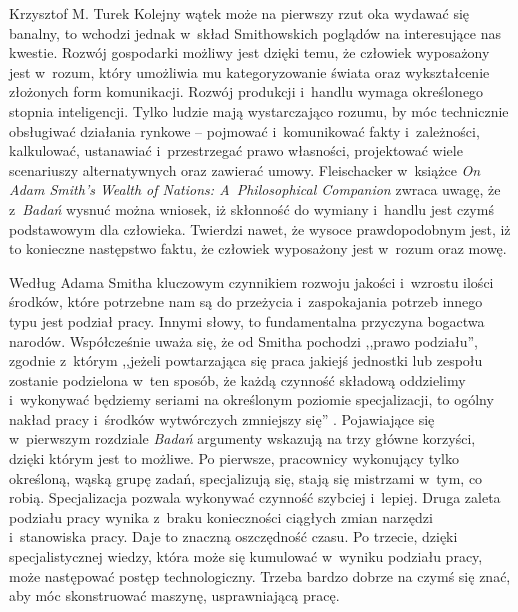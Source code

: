 \begin{artplenv}{Krzysztof M. Turek}
Kolejny wątek może na pierwszy rzut oka wydawać się banalny, to wchodzi jednak w~skład Smithowskich poglądów na
interesujące nas kwestie. Rozwój gospodarki możliwy jest dzięki temu, że człowiek wyposażony jest w~rozum, który
umożliwia mu kategoryzowanie świata oraz wykształcenie złożonych form komunikacji. Rozwój produkcji i~handlu wymaga
określonego stopnia inteligencji. Tylko ludzie mają wystarczająco rozumu, by móc technicznie obsługiwać działania
rynkowe -- pojmować i~komunikować fakty i~zależności, kalkulować, ustanawiać i~przestrzegać prawo własności, projektować
wiele scenariuszy alternatywnych oraz zawierać umowy. Fleischacker
\parencite*[s.~19]{fleischacker_adam_2005}
w~książce
\textit{On Adam Smith's Wealth of Nations: A~Philosophical Companion} zwraca uwagę, że z~\textit{Badań }wysnuć można
wniosek, iż skłonność do wymiany i~handlu jest czymś podstawowym dla człowieka. Twierdzi nawet, że wysoce
prawdopodobnym jest, iż to konieczne następstwo faktu, że człowiek wyposażony jest w~rozum oraz mowę.

Według Adama Smitha kluczowym czynnikiem rozwoju jakości i~wzrostu ilości środków, które potrzebne nam są do
przeżycia i~zaspokajania potrzeb innego typu jest podział pracy. Innymi słowy, to fundamentalna przyczyna bogactwa narodów.
Współcześnie uważa się, że od Smitha pochodzi ,,prawo podziału'', zgodnie z~którym ,,jeżeli powtarzająca się praca jakiejś
jednostki lub zespołu zostanie podzielona w~ten sposób, że każdą czynność składową oddzielimy i~wykonywać będziemy
seriami na określonym poziomie specjalizacji, to ogólny nakład pracy i~środków wytwórczych zmniejszy się''
\parencite{bielski_organizacje:_1997}.
Pojawiające się w~pierwszym rozdziale \textit{Badań} argumenty wskazują na
trzy główne korzyści, dzięki którym jest to możliwe. Po pierwsze, pracownicy wykonujący tylko określoną, wąską grupę
zadań, specjalizują się, stają się mistrzami w~tym, co robią. Specjalizacja pozwala wykonywać czynność
szybciej i~lepiej. Druga zaleta podziału pracy wynika z~braku konieczności ciągłych zmian narzędzi i~stanowiska pracy. Daje to
znaczną oszczędność czasu. Po trzecie, dzięki specjalistycznej wiedzy, która może się kumulować w~wyniku podziału
pracy, może następować postęp technologiczny. Trzeba bardzo dobrze na czymś się znać, aby móc skonstruować maszynę,
usprawniającą pracę.


\end{artplenv}
